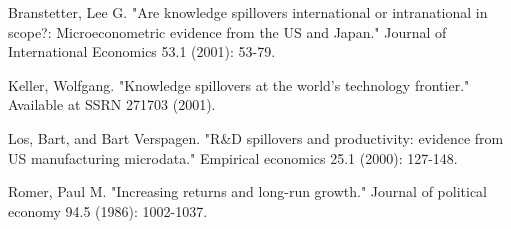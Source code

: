 \documentclass{article}
\begin{document}
\begin{thebibliography}{1}

\bibitem{} Branstetter, Lee G. "Are knowledge spillovers international or intranational in scope?: Microeconometric evidence from the US and Japan." Journal of International Economics 53.1 (2001): 53-79.

\bibitem{} Keller, Wolfgang. "Knowledge spillovers at the world's technology frontier." Available at SSRN 271703 (2001).

\bibitem{} Los, Bart, and Bart Verspagen. "R\&D spillovers and productivity: evidence from US manufacturing microdata." Empirical economics 25.1 (2000): 127-148.

\bibitem{} Romer, Paul M. "Increasing returns and long-run growth." Journal of political economy 94.5 (1986): 1002-1037.

\end{thebibliography}
\end{document}
